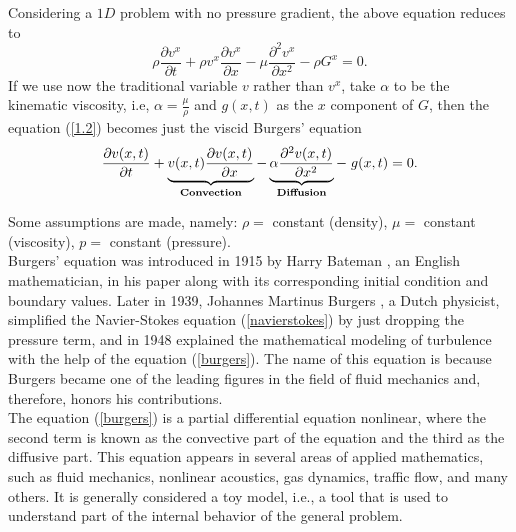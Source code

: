     \noindent Considering a $1D$ problem with no pressure gradient, the above equation reduces to\\
    \begin{equation}
        \rho \frac{\partial v^x}{\partial t} + \rho v^x \frac{\partial v^x}{\partial x} - \mu \frac{\partial^2 v^x}{\partial x^2} - \rho G^x = 0.
        \label{1.2}
    \end{equation}
    If we use now the traditional variable $v$ rather than $v^x$, take $\alpha$ to be the kinematic viscosity, i.e, $\alpha = \frac{\mu}{\rho}$ and $g (x, t)$ as the $x$ component of $G$, then the equation (\ref{1.2}) becomes just the viscid Burgers' equation
    \begin{equation}
        \frac{\partial v(x, t)}{\partial t} +  \underbrace{v(x, t) \frac{\partial v(x, t)}{\partial x}}_{\textbf{Convection}} - \underbrace{\alpha \frac{\partial^2 v(x, t)}{\partial x^2}}_{\textbf{Diffusion}} - \hspace{1mm}g(x, t) = 0.
        \label{burgers}
    \end{equation}

    Some assumptions  are  made,  namely: $\rho =$ constant (density), $\mu =$ constant  (viscosity),  $p=$ constant (pressure). \\
    
    Burgers' equation was introduced in 1915 by Harry Bateman \cite{Bateman1915}, an English mathematician, in his paper along with its corresponding initial condition and boundary values. Later in 1939, Johannes Martinus Burgers \cite{Burgers1939,Burgers1948}, a Dutch physicist, simplified the Navier-Stokes equation (\ref{navierstokes}) by just dropping the pressure term, and in 1948 explained the  mathematical modeling of turbulence with the help of the equation (\ref{burgers}). The name of this equation is because Burgers became one of the leading figures in the field of fluid mechanics and, therefore, honors his contributions. \\  
    
    The equation (\ref{burgers}) is a partial differential equation nonlinear, where the second term is known as the convective part of the equation and the third as the diffusive part. This equation appears in several areas of applied mathematics, such as fluid mechanics, nonlinear acoustics, gas dynamics, traffic flow, and many others. It is generally considered a toy model, i.e., a tool that is used to understand part of the internal behavior of the general problem.  \\
    
